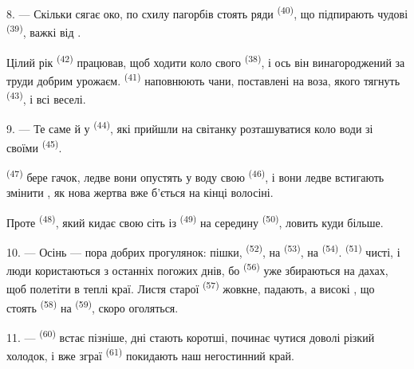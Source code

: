 8. --- Скільки сягає око, по схилу пагорбів стоять ряди 
\textsuperscript{(40)}, що підпирають чудові  \textsuperscript{(39)},
важкі від .

Цілий рік  \textsuperscript{(42)} працював, щоб ходити коло
свого  \textsuperscript{(38)}, і ось він винагороджений за
труди добрим урожаєм.  \textsuperscript{(41)} наповнюють
чани, поставлені на воза, якого тягнуть  \textsuperscript{(43)}, і
всі веселі.

\VUsaut{5.0mm}
\VUsaut{3.4mm}

9. --- Те саме й у  \textsuperscript{(44)}, які прийшли на
світанку розташуватися коло води зі своїми 
\textsuperscript{(45)}.

 \textsuperscript{(47)} бере гачок, ледве вони опустять у воду свою
 \textsuperscript{(46)}, і вони ледве встигають змінити
, як нова жертва вже б'ється на кінці волосіні.

Проте  \textsuperscript{(48)}, який кидає свою сіть із
 \textsuperscript{(49)} на середину 
\textsuperscript{(50)}, ловить куди більше.

10. --- Осінь --- пора добрих прогулянок: пішки, 
\textsuperscript{(52)}, на  \textsuperscript{(53)}, на
 \textsuperscript{(54)}.  \textsuperscript{(51)}
чисті, і люди користаються з останніх погожих днів, бо 
\textsuperscript{(56)} уже збираються на дахах, щоб полетіти в теплі краї. Листя
старої  \textsuperscript{(57)} жовкне,  падають, а
високі , що стоять  \textsuperscript{(58)} на
 \textsuperscript{(59)}, скоро оголяться.

11. ---  \textsuperscript{(60)} встає пізніше, дні стають коротші,
 починає чутися доволі різкий холодок, і вже зграї
 \textsuperscript{(61)} покидають наш негостинний край.
\VUsaut{6.0mm}
\VUfilet{22mm}
